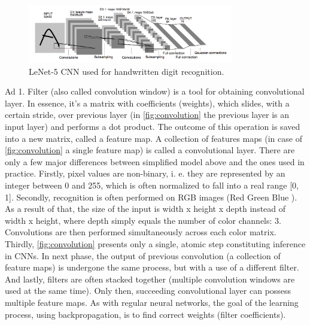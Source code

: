 \documentclass[11pt, a4paper]{article}
\begin{document}
\begin{figure}[h]
\includegraphics[width=0.8\textwidth]{lecun_net}
\centering
\caption[LeNet-5]{LeNet-5 CNN \cite{lecun_object} used for handwritten digit recognition.}
\label{fig:lecun_net}
\end{figure}

Ad 1. Filter (also called convolution window) is a tool for obtaining convolutional layer. In essence, it's a matrix with coefficients (weights), which slides, with a certain stride, over previous layer (in \autoref{fig:convolution} the previous layer is an input layer) and performs a dot product. The outcome of this operation is saved into a new matrix, called a feature map. A collection of features maps (in case of \autoref{fig:convolution} a single feature map) is called a convolutional layer. There are only a few major differences between simplified model above and the ones used in practice. Firstly, pixel values are non-binary, i. e. they are represented by an integer between 0 and 255, which is often normalized to fall into a real range [0, 1]. Secondly, recognition is often performed on RGB images (Red Green Blue \cite{rgb_def}). As a result of that, the size of the input is width x height x depth instead of width x height, where depth simply equals the number of color channels: 3. Convolutions are then performed simultaneously across each color matrix. Thirdly, \autoref{fig:convolution} presents only a single, atomic step constituting inference in CNNs. In next phase, the output of previous convolution (a collection of feature maps) is undergone the same process, but with a use of a different filter. And lastly, filters are often stacked together (multiple convolution windows are used at the same time). Only then, succeeding convolutional layer can possess multiple feature maps. As with regular neural networks, the goal of the learning process, using backpropagation, is to find correct weights (filter coefficients).\\
\end{document}
